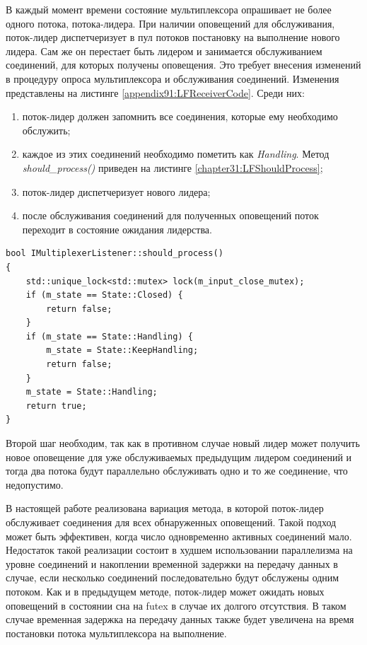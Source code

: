В каждый момент времени состояние мультиплексора опрашивает не более одного потока, потока-лидера. При наличии оповещений для обслуживания, поток-лидер диспетчеризует в пул потоков постановку на выполнение нового лидера. Сам же он перестает быть лидером и занимается обслуживанием соединений, для которых получены оповещения. Это требует внесения изменений в процедуру опроса мультиплексора и обслуживания соединений. Изменения представлены на листинге \ref{appendix91:LFReceiverCode}. Среди них:
\begin{enumerate}
\item поток-лидер должен запомнить все соединения, которые ему необходимо обслужить;
\item каждое из этих соединений необходимо пометить как \textit{Handling}. Метод \textit{should\_process()} приведен на листинге \ref{chapter31:LFShouldProcess};
\item поток-лидер диспетчеризует нового лидера;
\item после обслуживания соединений для полученных оповещений поток переходит в состояние ожидания лидерства.
\end{enumerate}

\begin{lstlisting}[float=!h,caption={Процедура подготовления соединения к обслуживанию в модели обслуживания соединений ''Лидер/Последователи``},label={chapter31:LFShouldProcess},frame=tlrb]
bool IMultiplexerListener::should_process()
{
    std::unique_lock<std::mutex> lock(m_input_close_mutex);
    if (m_state == State::Closed) {
        return false;
    }
    if (m_state == State::Handling) {
        m_state = State::KeepHandling;
        return false;
    }
    m_state = State::Handling;
    return true;
}
\end{lstlisting}

Второй шаг необходим, так как в противном случае новый лидер может получить новое оповещение для уже обслуживаемых предыдущим лидером соединений и тогда два потока будут параллельно обслуживать одно и то же соединение, что недопустимо.

В настоящей работе реализована вариация метода, в которой поток-лидер обслуживает соединения для всех обнаруженных оповещений. Такой подход может быть эффективен, когда число одновременно активных соединений мало. Недостаток такой реализации состоит в худшем использовании параллелизма на уровне соединений и накоплении временной задержки на передачу данных в случае, если несколько соединений последовательно будут обслужены одним потоком. Как и в предыдущем методе, поток-лидер может ожидать новых оповещений в состоянии сна на futex в случае их долгого отсутствия. В таком случае временная задержка на передачу данных также будет увеличена на время постановки потока мультиплексора на выполнение.

